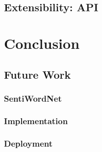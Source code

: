 \documentclass[a4paper]{article}
\begin{document}
\subsection{Extensibility: API}\label{section_api}

\section{Conclusion}
\subsection{Future Work}
\subsubsection{SentiWordNet}
\subsubsection{Implementation}
\subsubsection{Deployment}



\clearpage



\newpage
\end{document}
